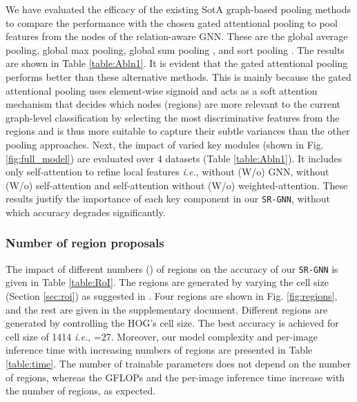 \documentclass[journal]{IEEEtran}
\begin{document}
We have evaluated the efficacy of the existing SotA graph-based pooling methods to compare the performance with the chosen gated attentional pooling to pool features from the nodes of the relation-aware GNN. These are the global average pooling, global max pooling, global sum pooling \cite{xu2018powerful}, and sort pooling \cite{zhang2018end}. The results are shown in Table \ref{table:Abln1}. It is evident that the gated attentional pooling performs better than these alternative methods. This is mainly because the gated attentional pooling uses element-wise sigmoid and acts as a soft attention mechanism that decides which nodes (regions) are more relevant to the current graph-level classification by selecting the most discriminative features from the regions and is thus more suitable to capture their subtle variances than the other pooling approaches. Next, the impact of varied key modules (shown in Fig. \ref{fig:full_model}) are evaluated over 4 datasets (Table \ref{table:Abln1}). It includes only self-attention to refine local features \textit{i.e.}, without (W/o) GNN, without (W/o) self-attention and self-attention without (W/o) weighted-attention. These results justify the importance of each key component in our \texttt{SR-GNN}, without which accuracy degrades significantly. 

\subsubsection{Number of region proposals}
The impact of different numbers () of regions on the accuracy of our \texttt{SR-GNN} is given in Table \ref{table:RoI}. The regions are generated by varying the cell size (Section \ref{sec:roi}) as suggested in \cite{behera2020regional}. Four regions are shown in Fig. \ref{fig:regions}, and the rest are given in the supplementary document. Different regions are generated by controlling the HOG's cell size. The best accuracy is achieved for cell size of 1414 \textit{i.e.},  =27. Moreover, our model complexity and per-image inference time with increasing numbers of regions are presented in Table \ref{table:time}. The number of trainable parameters does not depend on the number of regions, whereas the GFLOPs and the per-image inference time increase with the number of regions, as expected.
\end{document}

